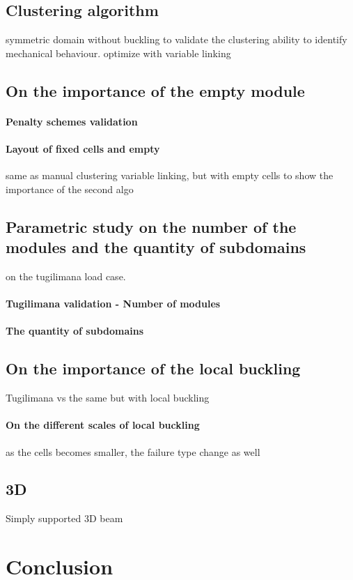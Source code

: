 \subsection{Clustering algorithm}
symmetric domain without buckling to validate the clustering ability to identify mechanical behaviour. optimize with variable linking

\subsection{On the importance of the empty module}

\paragraph{Penalty schemes validation}

\paragraph{Layout of fixed cells and empty}
same as manual clustering variable linking, but with empty cells to show the importance of the second algo

\subsection{Parametric study on the number of the modules and the quantity of subdomains}
on the tugilimana load case. 

\paragraph{Tugilimana validation - Number of modules}

\paragraph{The quantity of subdomains}

\subsection{On the importance of the local buckling}
Tugilimana vs the same but with local buckling

\paragraph{On the different scales of local buckling}
as the cells becomes smaller, the failure type change as well

\subsection{3D}
Simply supported 3D beam

\section{Conclusion}